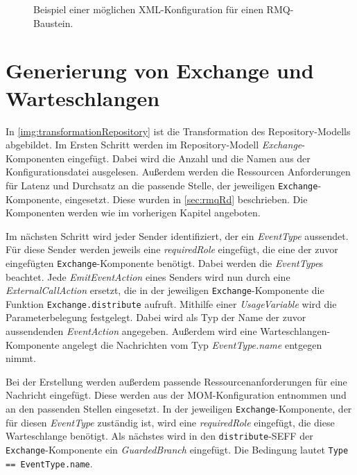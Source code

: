 \begin{figure}
\center
  
  \caption{Beispiel einer möglichen XML-Konfiguration für einen RMQ-Baustein.}
  \label{img:configExample}
\end{figure}

\section{Generierung von Exchange und Warteschlangen}
In \autoref{img:transformationRepository} ist die Transformation des Repository-Modells abgebildet. Im Ersten Schritt werden im Repository-Modell \emph{Exchange}-Komponenten eingefügt. Dabei wird die Anzahl und die Namen aus der Konfigurationsdatei ausgelesen. Außerdem werden die Ressourcen Anforderungen für Latenz und Durchsatz an die passende Stelle, der jeweiligen \texttt{Exchange}-Komponente, eingesetzt. Diese wurden in \autoref{sec:rmqRd} beschrieben. Die Komponenten werden wie im vorherigen Kapitel angeboten. \par
Im nächsten Schritt wird jeder Sender identifiziert, der ein \emph{EventType} aussendet. Für diese Sender werden jeweils eine \emph{requiredRole} eingefügt, die eine der zuvor eingefügten \texttt{Exchange}-Komponente benötigt. Dabei werden die \emph{EventType}s beachtet. Jede \emph{EmitEventAction} eines Senders wird nun durch eine \emph{ExternalCallAction} ersetzt, die in der jeweiligen \texttt{Exchange}-Komponente die Funktion \texttt{Exchange.distribute} aufruft. Mithilfe einer \emph{UsageVariable} wird die Parameterbelegung festgelegt. Dabei wird als Typ der Name der zuvor aussendenden \emph{EventAction} angegeben. Außerdem wird eine Warteschlangen-Komponente angelegt die Nachrichten vom Typ \emph{EventType.name} entgegen nimmt. 
\par
Bei der Erstellung werden außerdem passende Ressourcenanforderungen für eine Nachricht eingefügt. Diese werden aus der MOM-Konfiguration entnommen und an den passenden Stellen eingesetzt. In der jeweiligen \texttt{Exchange}-Komponente, der für diesen \emph{EventType} zuständig ist, wird eine \emph{requiredRole} eingefügt, die diese Warteschlange benötigt. Als nächstes wird in den \texttt{distribute}-SEFF der \texttt{Exchange}-Komponente ein \emph{GuardedBranch} eingefügt. Die Bedingung lautet \texttt{Type == EventType.name}. 
\par
